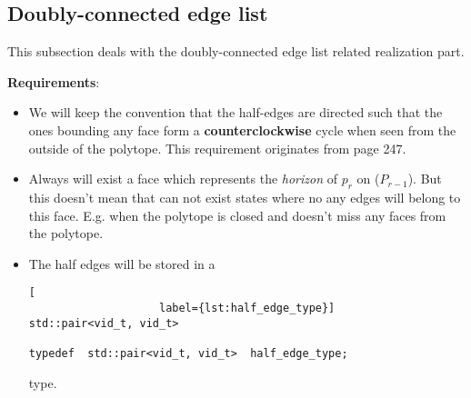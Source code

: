 

\subsection{Doubly-connected edge list}

This subsection deals with the doubly-connected edge list related realization
part.

\textbf{Requirements}:

\begin{itemize}

\item	We will keep the convention that the half-edges are directed such that
			the ones bounding any face form a \textbf{counterclockwise} cycle
			when seen from the outside of the polytope. This requirement
			originates from \citeauthor{compgeo08} page 247.

\item	Always will exist a face which represents the \textit{horizon} of $p_r$
			on \convhull($P_{r-1}$). But this doesn't mean that can not exist
			states where no any edges will belong to this face. E.g. when the
			polytope is closed and doesn't miss any faces from the polytope.

\item	The half edges will be stored in a
\begin{lstlisting}[
					label={lst:half_edge_type}]
std::pair<vid_t, vid_t>

typedef  std::pair<vid_t, vid_t>  half_edge_type;
\end{lstlisting}

		type. 

%		



\end{itemize}
